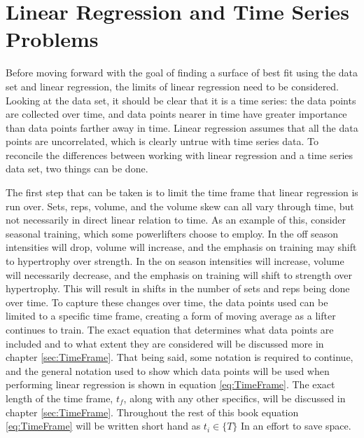 \section{Linear Regression and Time Series Problems}
\label{sec:PotentialSurfaceLinearRegressionAndTimeSeriesProblems}

Before moving forward with the goal of finding a surface of best fit using the data set and linear regression, the limits of linear regression need to be considered. Looking at the data set, it should be clear that it is a time series: the data points are collected over time, and data points nearer in time have greater importance than data points farther away in time. Linear regression assumes that all the data points are uncorrelated, which is clearly untrue with time series data. To reconcile the differences between working with linear regression and a time series data set, two things can be done.

The first step that can be taken is to limit the time frame that linear regression is run over. Sets, reps, volume, and the volume skew can all vary through time, but not necessarily in direct linear relation to time. As an example of this, consider seasonal training, which some powerlifters choose to employ. In the off season intensities will drop, volume will increase, and the emphasis on training may shift to hypertrophy over strength. In the on season intensities will increase, volume will necessarily decrease, and the emphasis on training will shift to strength over hypertrophy. This will result in shifts in the number of sets and reps being done over time. To capture these changes over time, the data points used can be limited to a specific time frame, creating a form of moving average as a lifter continues to train. The exact equation that determines what data points are included and to what extent they are considered will be discussed more in chapter \ref{sec:TimeFrame}. That being said, some notation is required to continue, and the general notation used to show which data points will be used when performing linear regression is shown in equation \ref{eq:TimeFrame}. The exact length of the time frame, $t_f$, along with any other specifics, will be discussed in chapter \ref{sec:TimeFrame}. Throughout the rest of this book equation \ref{eq:TimeFrame} will be written short hand as $t_i\in \{ T \}$ In an effort to save space.

